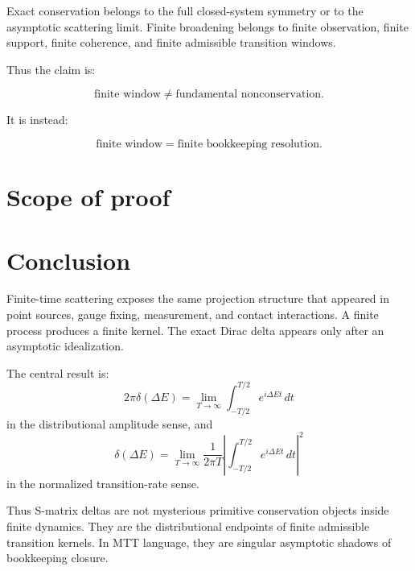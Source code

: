 \documentclass[11pt]{article}
\begin{document}
Exact conservation belongs to the full closed-system symmetry or to the asymptotic scattering limit.  Finite broadening belongs to finite observation, finite support, finite coherence, and finite admissible transition windows.

Thus the claim is:

\[
\text{finite window} \neq \text{fundamental nonconservation}.
\]

It is instead:

\[
\text{finite window} = \text{finite bookkeeping resolution}.
\]

\section{Scope of proof}

\begin{center}
\end{center}

\section{Conclusion}

Finite-time scattering exposes the same projection structure that appeared in point sources, gauge fixing, measurement, and contact interactions.  A finite process produces a finite kernel.  The exact Dirac delta appears only after an asymptotic idealization.

The central result is:
\[
\boxed{
2\pi\delta(\Delta E)
=
\lim_{T\to\infty}
\int_{-T/2}^{T/2}e^{i\Delta E t}\,dt
}
\]
in the distributional amplitude sense, and
\[
\boxed{
\delta(\Delta E)
=
\lim_{T\to\infty}
\frac{1}{2\pi T}\left|
\int_{-T/2}^{T/2}e^{i\Delta E t}\,dt
\right|^2
}
\]
in the normalized transition-rate sense.

Thus S-matrix deltas are not mysterious primitive conservation objects inside finite dynamics.  They are the distributional endpoints of finite admissible transition kernels.  In MTT language, they are singular asymptotic shadows of bookkeeping closure.
\end{document}
